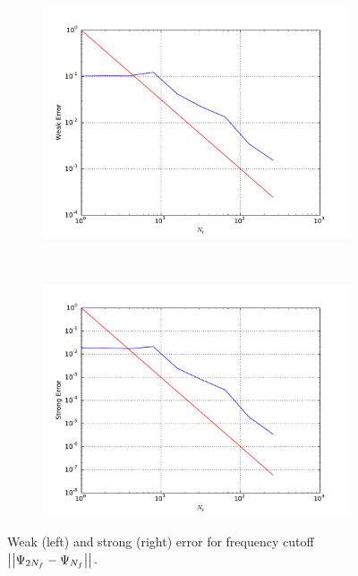 \documentclass[11pt]{amsart}
\begin{document}
\begin{figure}
    \centering
    \begin{subfigure}[b]{0.4\textwidth}
        \includegraphics[width=\textwidth]{weakerr2.pdf}
    \end{subfigure}
    ~ %
    \begin{subfigure}[b]{0.4\textwidth}
        \includegraphics[width=\textwidth]{strongerr2.pdf}
    \end{subfigure}
    \caption{\label{img:rateFig3} Weak (left) and strong (right) error
    for frequency cutoff
    $\left| {\left| {{\Psi_{2N_f}-\Psi_{N_f}}} \right|} \right|_{}$.}
\end{figure}
\end{document}
